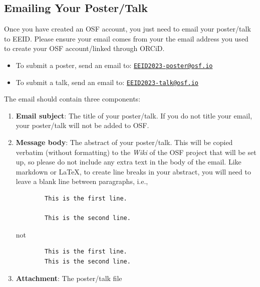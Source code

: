 \documentclass{scrartcl}
\begin{document}
\subsection{Emailing Your Poster/Talk}

Once you have created an OSF account, you just need to email your poster/talk to EEID. Please ensure your email comes from your the email address you used to create your OSF account/linked through ORCiD.

\begin{itemize}
    \item To submit a poster, send an email to: \href{mailto:EEID2023-poster@osf.io}{\texttt{EEID2023-poster@osf.io}}
    \item To submit a talk, send an email to: \href{mailto:EEID2023-talk@osf.io}{\texttt{EEID2023-talk@osf.io}}
\end{itemize}

The email should contain three components:

\begin{enumerate}
    \item \textbf{Email subject}: The title of your poster/talk.
    If you do not title your email, your poster/talk will not be added to OSF.
    \item \textbf{Message body}: The abstract of your poster/talk.
    This will be copied verbatim (without formatting) to the \emph{Wiki} of the OSF project that will be set up, so please do not include any extra text in the body of the email.
    Like markdown or \LaTeX, to create line breaks in your abstract, you will need to leave a blank line between paragraphs, i.e., 

    \begin{verbatim}
        This is the first line.
        
        This is the second line.
    \end{verbatim}

    not

    \begin{verbatim}
        This is the first line.
        This is the second line.
    \end{verbatim}

    \item \textbf{Attachment}: The poster/talk file
\end{enumerate}
\end{document}
